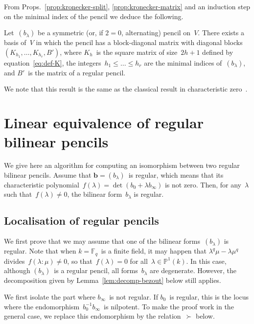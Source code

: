 \documentclass{article}%
\def\F{\mathbb{F}}
\begin{document}
From Props.~\ref{prop:kronecker-split}, \ref{prop:kronecker-matrix} and
an induction step on the minimal index of the pencil we deduce the
following.

\begin{prop}\label{prop:kronecker}%
Let~$(b_{λ})$ be a symmetric (or, if $2 = 0$, alternating) pencil on~$V$.
There exists a basis of~$V$ in which the pencil has a block-diagonal
matrix with diagonal blocks~$(K_{h_1}, …, K_{h_r}, B')$, where $K_h$~is
the square matrix of size~$2h+1$ defined by equation~\eqref{eq:def-K},
the integers~$h_1 ≤ … ≤ h_r$ are the minimal indices of~$(b_{λ})$, and
$B'$~is the matrix of a regular pencil.
\end{prop}

We note that this result is the same as the classical result in
characteristic zero~\cite[XII, §4]{Gantmacher}.
\section{Linear equivalence of regular bilinear pencils}%
\label{S:IP1S-regular}

We give here an algorithm for computing an isomorphism between two
regular bilinear pencils. Assume that $\bm{b} = (b_{λ})$~is regular,
which means that its characteristic polynomial~$f(λ) = \det (b_0 + λ
b_{∞})$ is not zero. Then, for any~$λ$ such that~$f(λ) ≠ 0$, the bilinear
form~$b_{λ}$ is regular.

\subsection{Localisation of regular pencils}%

We first prove that we may assume that one of the bilinear
forms~$(b_{λ})$ is regular.
Note that when $k = \F_q$~is a finite field, it may happen that $λ^q μ -
λ μ^q$ divides~$f(λ:μ) ≠ 0$, so that~$f(λ) = 0$ for all~$λ ∈ ℙ^1(k)$. In
this case, although $(b_{λ})$~is a regular pencil, all forms~$b_{λ}$ are
degenerate. However, the decomposition given by
Lemma~\ref{lem:decomp-bezout} below still applies.

We first isolate the part where $b_{∞}$~is not regular. If $b_{0}$~is
regular, this is the locus where the endomorphism~$b_{0}^{-1} b_{∞}$~is
nilpotent. To make the proof work in the general case, we replace this
endomorphism by the relation~$≻$ below.
\end{document}

